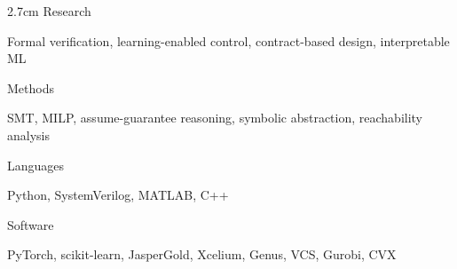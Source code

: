 \vspace{0.8mm}


\begin{cvsides}{2.7cm}
  \cvside
    {Research}
    {
      \vspace{-4.0mm}
      \begin{cvitems}
          \item {Formal verification, learning-enabled control, contract-based design, interpretable ML}
      \end{cvitems}
      \vspace{-4.0mm}
    }
  \cvside
    {Methods}
    {
      \vspace{-4.0mm}
      \begin{cvitems}
          \item {SMT, MILP, assume-guarantee reasoning, symbolic abstraction, reachability analysis}
      \end{cvitems}
      \vspace{-4.0mm}
    }
  \cvside
    {Languages}
    {
      \vspace{-4.0mm}
      \begin{cvitems}
        \item {Python, SystemVerilog, MATLAB, C++}
      \end{cvitems}
      \vspace{-4.0mm}
    }
  \cvside
    {Software}
    {
      \vspace{-4.0mm}
      \begin{cvitems}
        \item {PyTorch, scikit-learn, JasperGold, Xcelium, Genus, VCS, Gurobi, CVX}
      \end{cvitems}
      \vspace{-4.0mm}
    }
\end{cvsides}

